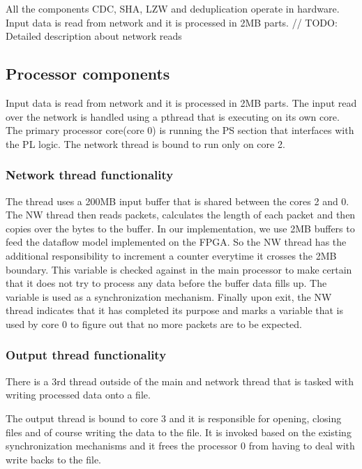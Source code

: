 \documentclass{article}
\begin{document}
All the components CDC, SHA, LZW and deduplication operate in hardware. 
Input data is read from network and it is processed in 2MB parts. 
// TODO: Detailed description about network reads
\newline\newline

\subsection{Processor components}
\newline\newline
Input data is read from network and it is processed in 2MB parts. 
\newline
The input read over the network is handled using a pthread that is executing on its own core. 
\newline
The primary processor core(core 0) is running the PS section that interfaces with the PL logic. 
\newline
The network thread is bound to run only on core 2. 
\newline

\subsubsection{Network thread functionality} 
\newline\newline
The thread uses a 200MB input buffer that is shared between the cores 2 and 0.
\newline
The NW thread then reads packets, calculates the length of each packet and then copies over the bytes to the buffer.
\newline
In our implementation, we use 2MB buffers to feed the dataflow model implemented on the FPGA.
\newline
So the NW thread has the additional responsibility to increment a counter everytime it crosses the 2MB boundary. 
This variable is checked against in the main processor to make certain that it does not try to process any data before the buffer data fills up. The variable is used as a synchronization mechanism.
\newline
Finally upon exit, the NW thread indicates that it has completed its purpose and marks a variable that is used by core 0 to figure out that no more packets are to be expected.
\newline

\subsubsection{Output thread functionality}
\newline\newline
There is a 3rd thread outside of the main and network thread that is tasked with writing processed data onto a file. 
\par
The output thread is bound to core 3 and it is responsible for opening, closing files and of course writing the data to the file. 
It is invoked based on the existing synchronization mechanisms and it frees the processor 0 from having to deal with write backs to the file. 
\newline
\end{document}
